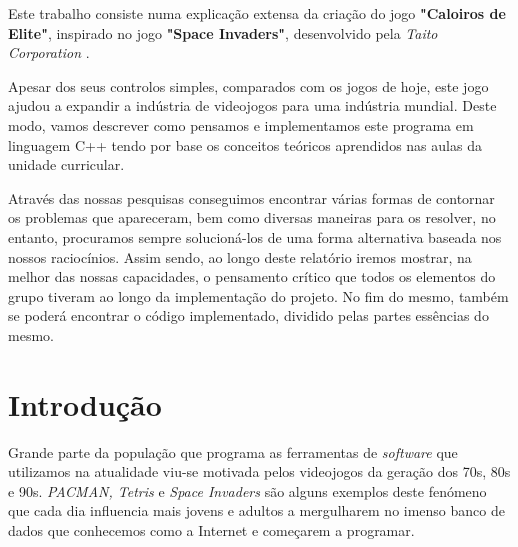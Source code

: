 \documentclass[a4paper,11pt]{article}
\newcommand\tab[1][0.8cm]{\hspace*{#1}}
\begin{document}
\tab Este trabalho consiste numa explicação extensa da criação do jogo \textbf{"Caloiros de Elite"}, inspirado no jogo \textbf{"Space Invaders"}, desenvolvido pela \textit{Taito Corporation} \cite{spaceInv}.  \par

\vspace{8pt}

Apesar dos seus controlos simples,
comparados com os jogos de hoje, este jogo ajudou a expandir a indústria de videojogos para
uma indústria mundial. Deste modo, vamos descrever como pensamos e implementamos este programa em linguagem C++ tendo por base os conceitos teóricos aprendidos nas aulas da unidade curricular.

\vspace{8pt}

Através das nossas pesquisas conseguimos encontrar várias formas de contornar os problemas que apareceram, bem como diversas maneiras para os resolver, no entanto, procuramos sempre solucioná-los de uma forma alternativa baseada nos nossos raciocínios. Assim sendo, ao longo deste relatório iremos mostrar, na melhor das nossas capacidades, o pensamento crítico que todos os elementos do grupo tiveram ao longo da implementação do projeto. No fim do mesmo, também se poderá encontrar o código implementado, dividido pelas partes essências do mesmo.

\vspace{40pt}


\pagebreak

\pagebreak


\renewcommand{\contentsname}{Índice}        %
\tableofcontents
{}

\vspace{40pt}
\listoffigures

\vspace{40pt}
\listoftables

\pagebreak


\setcounter{secnumdepth}{3}


\section{Introdução}\label{Intro}

\setcounter{page}{1}
\tab

\vspace{8pt}

Grande parte da população que programa as ferramentas de \textit{software} que utilizamos na atualidade viu-se motivada pelos videojogos da geração dos 70s, 80s e 90s. \textit{PACMAN, Tetris} e \textit{Space Invaders} são alguns exemplos deste fenómeno que cada dia influencia mais jovens e adultos a mergulharem no imenso banco de dados que conhecemos como a Internet e começarem a programar.
\end{document}
